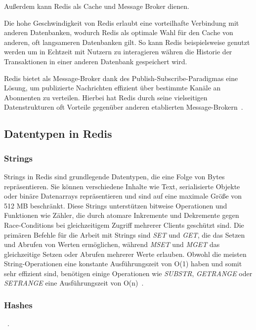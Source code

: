 Außerdem kann Redis als Cache und Message Broker dienen.

Die hohe Geschwindigkeit von Redis erlaubt eine vorteilhafte Verbindung mit anderen Datenbanken, wodurch Redis als optimale Wahl für den Cache von anderen, oft langsameren Datenbanken gilt. So kann Redis beispielsweise genutzt werden um in Echtzeit mit Nutzern zu interagieren währen die Historie der Transaktionen in einer anderen Datenbank gespeichert wird.

Redis bietet als Message-Broker dank des Publish-Subscribe-Paradigmas eine Lösung, um publizierte Nachrichten effizient über bestimmte Kanäle an Abonnenten zu verteilen. Hierbei hat Redis durch seine vielseitigen Datenstrukturen oft Vorteile gegenüber anderen etablierten Message-Brokern~\cite{joshi_you_nodate}.



\subsection{Datentypen in Redis}
\subsubsection{Strings}
Strings in Redis sind grundlegende Datentypen, die eine Folge von Bytes repräsentieren.
Sie können verschiedene Inhalte wie Text, serialisierte Objekte oder binäre Datenarrays repräsentieren und sind auf eine maximale Größe von 512 MB beschränkt.
Diese Strings unterstützen bitweise Operationen und Funktionen wie Zähler, die durch atomare Inkremente und Dekremente gegen Race-Conditions bei gleichzeitigem Zugriff mehrerer Clients geschützt sind.
Die primären Befehle für die Arbeit mit Strings sind \emph{SET} und \emph{GET}, die das Setzen und Abrufen von Werten ermöglichen, während \emph{MSET} und \emph{MGET} das gleichzeitige Setzen oder Abrufen mehrerer Werte erlauben.
Obwohl die meisten String-Operationen eine konstante Ausführungszeit von O(1) haben und somit sehr effizient sind, benötigen einige Operationen wie \emph{SUBSTR}, \emph{GETRANGE} oder \emph{SETRANGE} eine Ausführungszeit von O(n)~\cite{redis_strings_nodate}.

\subsubsection{Hashes}

~\cite{redis_hashes_nodate}.
